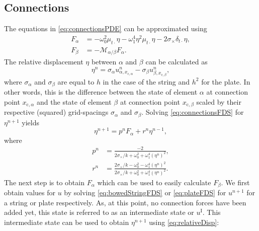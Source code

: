 \documentclass{article}
\begin{document}
\subsection{Connections}
The equations in \eqref{eq:connectionsPDE} can be approximated using \cite{Bilbao2009:ModularPercussion}
\begin{subequations}
\begin{align}\label{eq:connectionsFDS}
    F_\alpha &= -\omega_0^2\mu_{t\cdot}\eta - \omega_1^4\eta^2\mu_{t\cdot}\eta - 2\sigma_\times\delta_{t\cdot}\eta,\\
    F_\beta &= -\mathcal{M}_{\alpha/\beta}F_\alpha.
\end{align}
\end{subequations}
The relative displacement $\eta$ between $\alpha$ and $\beta$ can be calculated as
\begin{equation}\label{eq:relativeDisp}
    \eta^n = \sigma_\alpha u_{\alpha, x_{\text{c},\alpha}}^n - \sigma_\beta u_{\beta,x_{\text{c},\beta}}^n,
\end{equation}
where $\sigma_\alpha$ and $\sigma_\beta$ are equal to $h$ in the case of the string and $h^2$ for the plate. In other words, this is the difference between the state of element $\alpha$ at connection point $x_{\text{c},\alpha}$ and the state of element $\beta$ at connection point $x_{\text{c},\beta}$ scaled by their respective (squared) grid-spacings $\sigma_\alpha$ and $\sigma_\beta$. Solving \eqref{eq:connectionsFDS} for $\eta^{n+1}$ yields
\begin{equation} \label{eq:etaNext}
    \eta^{n+1} = p^nF_\alpha+r^n\eta^{n-1},
\end{equation}
where
\begin{subequations}
\begin{align}
    p^n &= \frac{-2}{2\sigma_\times / k + \omega_0^2 + \omega_1^4(\eta^n)^2},\\
    r^n &= \frac{2\sigma_\times / k - \omega_0^2 -\omega_1^4(\eta^n)^2}{2\sigma_\times / k + \omega_0^2 + \omega_1^4(\eta^n)^2}.
\end{align}
\end{subequations}
The next step is to obtain $F_\alpha$ which can be used to easily calculate $F_\beta$. We first obtain values for $u$ by solving \eqref{eq:bowedStringFDS} or \eqref{eq:plateFDS} for $u^{n+1}$ for a string or plate respectively. As, at this point, no connection forces have been added yet, this state is referred to as an intermediate state or $u^\text{I}$. This intermediate state can be used to obtain $\eta^{n+1}$ using \eqref{eq:relativeDisp}:
\end{document}
